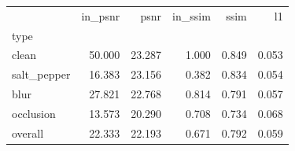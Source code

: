 \begin{tabular}{lrrrrr}
\toprule
 & in_psnr & psnr & in_ssim & ssim & l1 \\
type &  &  &  &  &  \\
\midrule
clean & 50.000 & 23.287 & 1.000 & 0.849 & 0.053 \\
salt_pepper & 16.383 & 23.156 & 0.382 & 0.834 & 0.054 \\
blur & 27.821 & 22.768 & 0.814 & 0.791 & 0.057 \\
occlusion & 13.573 & 20.290 & 0.708 & 0.734 & 0.068 \\
overall & 22.333 & 22.193 & 0.671 & 0.792 & 0.059 \\
\bottomrule
\end{tabular}
